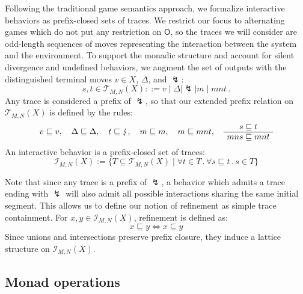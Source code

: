 \documentclass[acmsmall,timestamp,review]{acmart}
\newcommand{\kw}[1]{\ensuremath{ \mathsf{#1} }}
\begin{document}
Following the traditional game semantics approach,
we formalize interactive behaviors as prefix-closed sets of traces.
We restrict our focus to
alternating games which do not put any restriction on $\kw{O}$,
so the traces we will consider are odd-length sequences of moves
representing the interaction between the system and the environment.
To support the monadic structure and account
for silent divergence and undefined behaviors,
we augment the set of outputs with the
distinguished terminal moves $v \in X$, $\Delta$, and $\lightning$:
\[
    s, t \in
    \mathcal{T}_{M,N}(X) ::=
    v \mid \Delta \mid \lightning \mid m \mid mnt \,.
\]
Any trace is considered a prefix of $\lightning$,
so that our extended prefix relation on $\mathcal{T}_{M,N}(X)$
is defined by the rules:
\begin{gather*}
  v \sqsubseteq v , \quad
  \Delta \sqsubseteq \Delta , \quad
  t \sqsubseteq \lightning , \quad
  m \sqsubseteq m , \quad
  m \sqsubseteq mnt ,
  \quad
  \AxiomC{$s \sqsubseteq t$}
  \UnaryInfC{$mns \sqsubseteq mnt$}
  \DisplayProof
\end{gather*}
An interactive behavior is
a prefix-closed set of traces:
\[
    \mathcal{I}_{M,N}(X) :=
    \{ T \subseteq \mathcal{T}_{M,N}(X) \mid
       \forall t \in T \,.\, \forall s \sqsubseteq t \,.\, s \in T \}
\]

Note that since any trace is a prefix of $\lightning$,
a behavior which admits a trace ending with $\lightning$
will also admit all possible interactions
sharing the same initial segment.
This allows us to define our notion of refinement
as simple trace containment.
For $x, y \in \mathcal{I}_{M,N}(X)$, refinement is defined as:
\[
    x \sqsubseteq y \Leftrightarrow x \subseteq y
\]
Since unions and intersections
preserve prefix closure,
they induce a lattice structure on $\mathcal{I}_{M,N}(X)$.


\subsection{Monad operations} %
\end{document}
